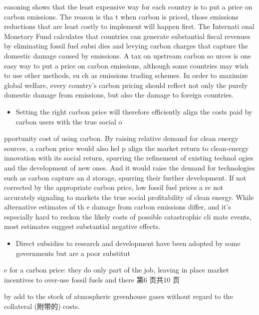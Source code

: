 \documentclass[UTF8,11pt]{ctexart}
\begin{document}
easoning shows that the least expensive way for each country is to put a price on carbon emissions. The reason is tha t when carbon is priced, those emissions reductions that are least costly to implement will happen first. The Internati onal Monetary Fund calculates that countries can generate substantial fiscal revenues by eliminating fossil fuel subsi dies and levying carbon charges that capture the domestic damage caused by emissions. A tax on upstream carbon so urces is one easy way to put a price on carbon emissions, although some countries may wish to use other methods, su ch as emissions trading schemes. In order to maximize global welfare, every country's carbon pricing should reflect not only the purely domestic damage from emissions, but also the damage to foreign countries.


\begin{itemize}[leftmargin=2em,itemsep=.2em,topsep=.4em]\item[M.] Setting the right carbon price will therefore efficiently align the costs paid by carbon users with the true social o
\end{itemize}

pportunity cost of using carbon. By raising relative demand for clean energy sources, a carbon price would also hel p align the market return to clean-energy innovation with its social return, spurring the refinement of existing technol ogies and the development of new ones. And it would raise the demand for technologies such as carbon capture an d storage, spurring their further development. If not corrected by the appropriate carbon price, low fossil fuel prices a re not accurately signaling to markets the true social profitability of clean energy. While alternative estimates of th e damage from carbon emissions differ, and it's especially hard to reckon the likely costs of possible catastrophic cli mate events, most estimates suggest substantial negative effects.


\begin{itemize}[leftmargin=2em,itemsep=.2em,topsep=.4em]\item[N.] Direct subsidies to research and development have been adopted by some governments but are a poor substitut
\end{itemize}

e for a carbon price: they do only part of the job, leaving in place market incentives to over-use fossil fuels and there 第6 页共10 页


by add to the stock of atmospheric greenhouse gases without regard to the collateral (附带的) costs.
\end{document}
